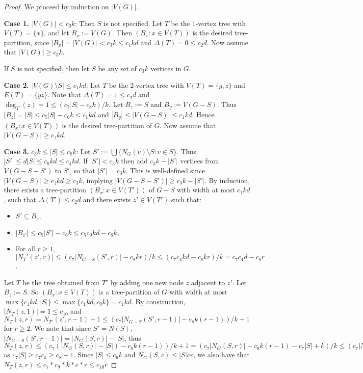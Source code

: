 \begin{proof}
We proceed by induction on $|V(G)$|.

\textbf{Case 1.} $|V(G)| < c_3 k$: Then $S$ is not specified. Let $T$ be the 1-vertex tree with $V(T)=\{x\}$, and let $B_x:=V(G)$. Then $(B_x:x\in V(T))$ is the desired tree-partition, since $|B_x|=|V(G)|<c_3 k \leq c_1 kd$ and $\Delta(T)=0\leq c_2d$. Now assume that $|V(G)| \geq c_3 k$. 

If $S$ is not specified, then let $S$ be any set of $c_3k$ vertices in $G$. 

\textbf{Case 2.} $|V(G)\setminus S|\leq c_1kd$: Let $T$ be the 2-vertex tree with $V(T)=\{y,z\}$ and $E(T)=\{yz\}$. Note that $\Delta(T)=1\leq c_2 d$ and $\deg_T(z)=1\leq (c_7|S|-c_8k)/k$. Let $B_z:=S$ and $B_y:=V(G-S)$. Thus $|B_z|=|S|\leq c_5|S|-c_6k\leq c_1kd$ and $|B_y|\leq |V(G-S)|\leq c_1kd$. Hence $(B_x:x\in V(T))$ is the desired tree-partition of $G$. Now assume that $|V(G-S)|\geq c_1kd$.



\textbf{Case 3.} $c_3k \leq |S|\leq c_9 k$: Let $S':=\bigcup\{ N_G(v)\setminus S: v\in S\}$. Thus $|S'|\leq d |S|\leq c_9 kd\leq c_4kd$. If $|S'|< c_3 k$ then add $c_3k-|S'|$ vertices from $V(G-S-S')$ to $S'$, so that $|S'|=c_3k$. This is well-defined since 
$|V(G-S)| \geq c_1kd \geq c_3k$, implying $|V(G-S-S')| \geq c_3k-|S'|$.
By induction, there exists a tree-partition $(B_x:x\in V(T'))$ of $G-S$ with width at most $c_1 kd$, such that $\Delta(T')\leq c_2d$ and there exists $z'\in V(T')$ such that:
\begin{itemize}
    \item $S'\subseteq B_z$, 
    \item $|B_{z'}|\leq c_5|S'|-c_6k \leq c_5c_9kd -c_6k$,
    \item For all $r\geq 1$, $|N_T'(z',r)|\leq ( c_7 |N_{G-S}(S',r)| - c_8 kr)/k \leq (c_7 c_4kd-c_8kr)/k= c_7c_4d-c_8r$. 
\end{itemize}
Let $T$ be the tree obtained from $T'$ by adding one new node $z$ adjacent to $z'$. Let $B_z:=S$. So $(B_x:x\in V(T))$ is a tree-partition of $G$ with width at most $\max\{c_1kd,|S|\}\leq\max\{c_1kd,c_9k\}=c_1kd$. By construction, $|N_T(z,1)|=1\leq c_10$ and $N_T(z,r)=N_{T'}(z',r-1)+1\leq ( c_7 |N_{G-S}(S',r-1)| - c_8 k(r-1))/k + 1$ for $r\geq 2$. We note that since $S'=N(S)$, $|N_{G-S}(S',r-1)|=|N_G(S,r)|-|S|$, thus $N_T(z,r)\leq ( c_7 (|N_G(S,r)|-|S|) - c_8 k(r-1))/k + 1 = ( c_7|N_G(S,r)| - c_8 k(r-1) - c_7|S|+k)/k\leq ( c_7|N_G(S,r)| - c_8 kr)/k$ as $c_7|S|\geq c_7c_3\geq c_8+1$. Since $|S|\leq c_9k$ and $N_G(S,r)\leq |S|cr$, we also have that $N_T(z,r)\leq c_7*c_9*k*c*r\leq c_10r$


\end{proof}
